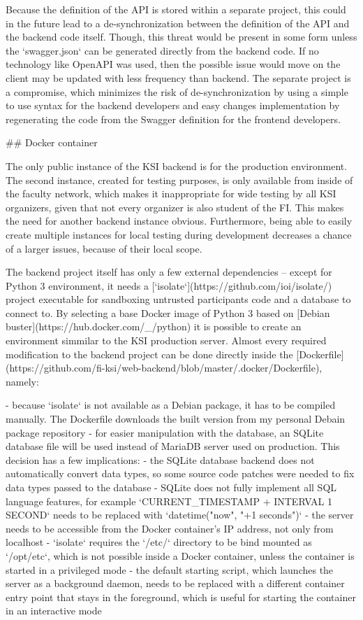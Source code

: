 \documentclass[
  digital, %
  oneside, %
  lof,     %
  lot,     %
]{fithesis4}
\begin{document}
{Because the definition of the API is stored within a separate project, this could in the future lead to a de-synchronization between the definition of the API and the backend code itself. Though, this threat would be present in some form unless the `swagger.json` can be generated directly from the backend code. If no technology like OpenAPI was used, then the possible issue would move on the client may be updated with less frequency than backend. The separate project is a compromise, which minimizes the risk of de-synchronization by using a simple to use syntax for the backend developers and easy changes implementation by regenerating the code from the Swagger definition for the frontend developers.

## Docker container

The only public instance of the KSI backend is for the production environment. The second instance, created for testing purposes, is only available from inside of the faculty network, which makes it inappropriate for wide testing by all KSI organizers, given that not every organizer is also student of the FI. This makes the need for another backend instance obvious. Furthermore, being able to easily create multiple instances for local testing during development decreases a chance of a larger issues, because of their local scope.

The backend project itself has only a few external dependencies -- except for Python 3 environment, it needs a [`isolate`](https://github.com/ioi/isolate/) project executable for sandboxing untrusted participants code and a database to connect to. By selecting a base Docker image of Python 3 based on [Debian buster](https://hub.docker.com/_/python) it is possible to create an environment simmilar to the KSI production server. Almost every required modification to the backend project can be done directly inside the [Dockerfile](https://github.com/fi-ksi/web-backend/blob/master/.docker/Dockerfile), namely:

- because `isolate` is not available as a Debian package, it has to be compiled manually. The Dockerfile downloads the built version from my personal Debain package repository
- for easier manipulation with the database, an SQLite database file will be used instead of MariaDB server used on production. This decision has a few implications:
  - the SQLite database backend does not automatically convert data types, so some source code patches were needed to fix data types passed to the database
  - SQLite does not fully implement all SQL language features, for example `CURRENT_TIMESTAMP + INTERVAL 1 SECOND` needs to be replaced with `datetime("now", "+1 seconds")`
- the server needs to be accessible from the Docker container's IP address, not only from localhost
- `isolate` requires the `/etc/` directory to be bind mounted as `/opt/etc`, which is not possible inside a Docker container, unless the container is started in a privileged mode
- the default starting script, which launches the server as a background daemon, needs to be replaced with a different container entry point that stays in the foreground, which is useful for starting the container in an interactive mode

}
\end{document}
